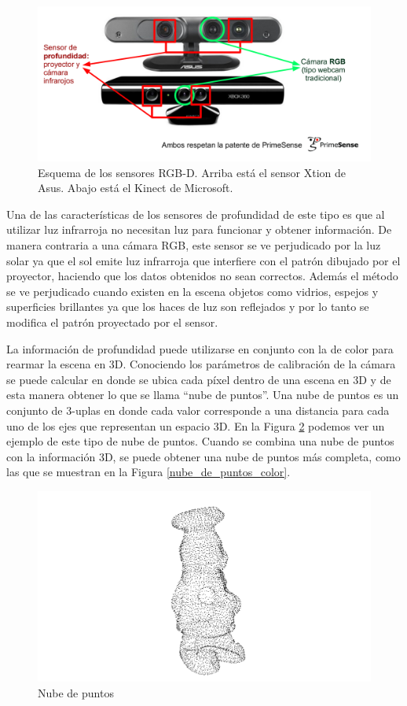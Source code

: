 \begin{figure}
	\centering
	\includegraphics[width=\textwidth]{img/sensores/sensores_rgbd.png}
	\caption{Esquema de los sensores RGB-D. Arriba está el sensor Xtion de Asus. Abajo está el Kinect de Microsoft.}
    \label{fig:sensores_rgbd}
\end{figure}

Una de las características de los sensores de profundidad de este tipo es que al utilizar luz infrarroja no necesitan luz para funcionar y obtener información. De manera contraria a una cámara RGB, este sensor se ve perjudicado por la luz solar ya que el sol emite luz infrarroja que interfiere con el patrón dibujado por el proyector, haciendo que los datos obtenidos no sean correctos. Además el método se ve perjudicado cuando existen en la escena objetos como vidrios, espejos y superficies brillantes ya que los haces de luz son reflejados y por lo tanto se modifica el patrón proyectado por el sensor.

La información de profundidad puede utilizarse en conjunto con la de color para rearmar la escena en 3D. Conociendo los parámetros de calibración de la cámara se puede calcular en donde se ubica cada píxel dentro de una escena en 3D y de esta manera obtener lo que se llama ``nube de puntos''. Una nube de puntos es un conjunto de 3-uplas en donde cada valor corresponde a una distancia para cada uno de los ejes que representan un espacio 3D. En la Figura \ref{nube_de_puntos_sola} podemos ver un ejemplo de este tipo de nube de puntos. Cuando se combina una nube de puntos con la información 3D, se puede obtener una nube de puntos más completa, como las que se muestran en la Figura \ref{nube_de_puntos_color}.

\begin{figure}
	\centering
	\includegraphics[width=\textwidth]{img/nube_de_puntos_sola.png}
	\caption{Nube de puntos}
    \label{nube_de_puntos_sola}
\end{figure}


